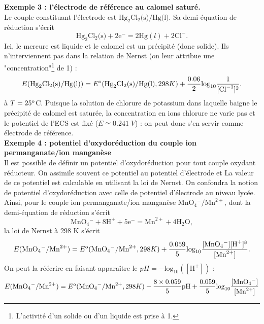 \documentclass[11pt,a4paper]{report}
\begin{document}
\textbf{Exemple 3 : l'électrode de référence au calomel saturé.}\\
Le couple constituant l'électrode est $\text{Hg}_2\text{Cl}_2\text{(s)}/\text{Hg(l)}$. Sa demi-équation de réduction s'écrit
\begin{equation}
	\text{Hg}_2\text{Cl}_2\text{(s)} + 2\text{e}^- = 2\text{Hg}(l) + 2\text{Cl}^-.
\end{equation}
Ici, le mercure est liquide et le calomel est un précipité (donc solide). Ils n'interviennent pas dans la relation de Nernst (on leur attribue une "concentration"\footnote{L'activité d'un solide ou d'un liquide est prise à 1.} de 1) :
\begin{equation}
	E(\text{Hg}_2\text{Cl}_2\text{(s)}/\text{Hg(l)}) = E\textsuperscript{o}(\text{Hg}_2\text{Cl}_2\text{(s)}/\text{Hg(l)}, 298 K)
	+ \frac{0.06}{2}\text{log}_{10}\frac{1}{[\text{Cl}^{-1}]^2}.
\end{equation}
à $T = 25\textsuperscript{o}$C. 
Puisque la solution de chlorure de potassium dans laquelle baigne le précipité de calomel est saturée, la concentration en ions chlorure ne varie pas et le potentiel de l'ECS est fixé ($E \simeq 0.241\;V$) : on peut donc s'en servir comme électrode de référence.\\

\textbf{Exemple 4 : potentiel d'oxydoréduction du couple ion permanganate/ion manganèse}\\
Il est possible de définir un potentiel d'oxydoréduction pour tout couple oxydant réducteur. On assimile souvent ce potentiel au potentiel d'électrode et La valeur de ce potentiel est calculable en utilisant la loi de Nernst. On confondra la notion de potentiel d'oxydoréduction avec celle de potentiel d'électrode au niveau lycée. Ainsi, pour le couple ion permanganate/ion manganèse $\text{MnO}_4 {}^- / \text{Mn}^{2+}$, dont la demi-équation de réduction s'écrit
\begin{equation}
	\text{MnO}_4 {}^- + 8\text{H}^+ + 5\text{e}^- = \text{Mn}^{2+} + 4\text{H}_2\text{O},
\end{equation}
la loi de Nernst à 298 K s'écrit 
\begin{equation}
	E(\text{MnO}_4 {}^- / \text{Mn}^{2+}) = E\textsuperscript{o}(\text{MnO}_4 {}^- / \text{Mn}^{2+}, 298 K) 
	+ \frac{0.059}{5}\text{log}_{10}\frac{[\text{MnO}_4 {}^-][\text{H}^+]^8}{[\text{Mn}^{2+}]}.
\end{equation}
On peut la réécrire en faisant apparaître le $pH = - \text{log}_{10}([\text{H}^+])$ :
\begin{equation}
	E(\text{MnO}_4 {}^- / \text{Mn}^{2+}) = E\textsuperscript{o}(\text{MnO}_4 {}^- / \text{Mn}^{2+}, 298 K) - \frac{8\times0.059}{5}\text{pH}
	+ \frac{0.059}{5}\text{log}_{10}\frac{[\text{MnO}_4 {}^-]}{[\text{Mn}^{2+}]}\\
\end{equation}
\end{document}

